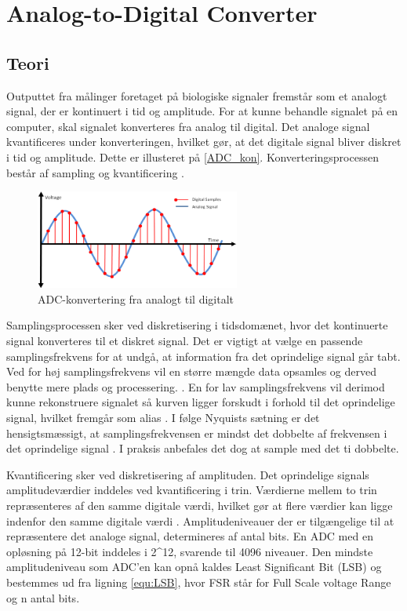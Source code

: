 \section{Analog-to-Digital Converter}
\subsection{Teori}

Outputtet fra målinger foretaget på biologiske signaler fremstår som et analogt signal, der er kontinuert i tid og amplitude. For at kunne behandle signalet på en computer, skal signalet konverteres fra analog til digital. Det analoge signal kvantificeres under konverteringen, hvilket gør, at det digitale signal bliver diskret i tid og amplitude. \citep{webster1998} Dette er illusteret på \autoref{ADC_kon}. Konverteringsprocessen består af sampling og kvantificering \citep{morre2003}. 

\begin{figure}[H]
\centering
\includegraphics[width=0.6\textwidth]{figures/problemloesning/adc.png}
\caption{ADC-konvertering fra analogt til digitalt}
\label{fig:ADC_kon}
\end{figure}

Samplingsprocessen sker ved diskretisering i tidsdomænet, hvor det kontinuerte signal konverteres til et diskret signal. Det er vigtigt at vælge en passende samplingsfrekvens for at undgå, at information fra det oprindelige signal går tabt.\citep{morre2003} Ved for høj samplingsfrekvens vil en større mængde data opsamles og derved benytte mere plads og processering. \citep{wolf2004}. En for lav samplingsfrekvens vil derimod kunne rekonstruere signalet så kurven ligger forskudt i forhold til det oprindelige signal, hvilket fremgår som alias \citep{morre2003}. I følge Nyquists sætning er det hensigtsmæssigt, at samplingsfrekvensen er mindst det dobbelte af frekvensen i det oprindelige signal \citep{morre2003}. I praksis anbefales det dog at sample med det ti dobbelte.

Kvantificering sker ved diskretisering af amplituden. Det oprindelige signals amplitudeværdier inddeles ved kvantificering i trin. Værdierne mellem to trin repræsenteres af den samme digitale værdi, hvilket gør at flere værdier kan ligge indenfor den samme digitale værdi \citep{morre2003}. Amplitudeniveauer der er tilgængelige til at repræsentere det analoge signal, determineres af antal bits. En ADC med en opløsning på 12-bit inddeles i {2}^{12}, svarende til 4096 niveauer. Den mindste amplitudeniveau som ADC'en kan opnå kaldes Least Significant Bit (LSB) og bestemmes ud fra ligning \autoref{equ:LSB}, hvor FSR står for Full Scale voltage Range og n antal bits. \citep{webster1998, wolf2004}

